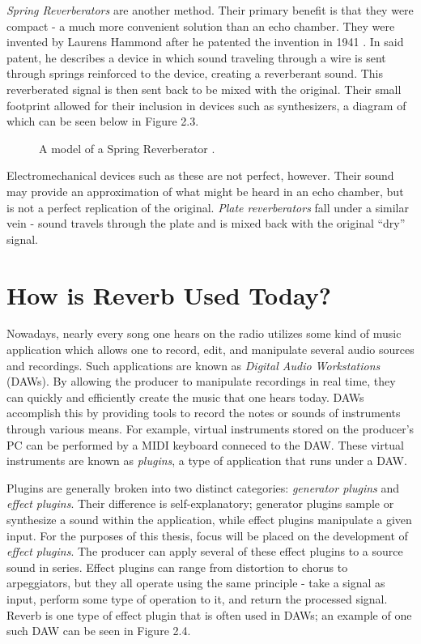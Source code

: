 \textit{Spring Reverberators} are another method. Their primary benefit is that they were compact - a much more convenient solution than an echo chamber. They were invented by Laurens Hammond after he patented the invention in 1941 \cite{laurens1941electrical}. In said patent, he describes a device in which sound traveling through a wire is sent through springs reinforced to the device, creating a reverberant sound. This reverberated signal is then sent back to be mixed with the original. Their small footprint allowed for their inclusion in devices such as synthesizers, a diagram of which can be seen below in Figure 2.3.

\begin{figure}[h] %
	\begin{center}
		\caption{A model of a Spring Reverberator \cite{devoe1977electronmusic}.}
	\end{center}
\end{figure}

Electromechanical devices such as these are not perfect, however. Their sound may provide an approximation of what might be heard in an echo chamber, but is not a perfect replication of the original. \textit{Plate reverberators} fall under a similar vein - sound travels through the plate and is mixed back with the original ``dry'' signal.

\section{How is Reverb Used Today?}
Nowadays, nearly every song one hears on the radio utilizes some kind of music application which allows one to record, edit, and manipulate several audio sources and recordings. Such applications are known as \textit{Digital Audio Workstations} (DAWs). By allowing the producer to manipulate recordings in real time, they can quickly and efficiently create the music that one hears today. DAWs accomplish this by providing tools to record the notes or sounds of instruments through various means. For example, virtual instruments stored on the producer's PC can be performed by a MIDI keyboard conneced to the DAW. These virtual instruments are known as \textit{plugins}, a type of application that runs under a DAW.

Plugins are generally broken into two distinct categories: \textit{generator plugins} and \textit{effect plugins}. Their difference is self-explanatory; generator plugins sample or synthesize a sound within the application, while effect plugins manipulate a given input. For the purposes of this thesis, focus will be placed on the development of \textit{effect plugins}. The producer can apply several of these effect plugins to a source sound in series. Effect plugins can range from distortion to chorus to arpeggiators, but they all operate using the same principle - take a signal as input, perform some type of operation to it, and return the processed signal. Reverb is one type of effect plugin that is often used in DAWs; an example of one such DAW can be seen in Figure 2.4.

